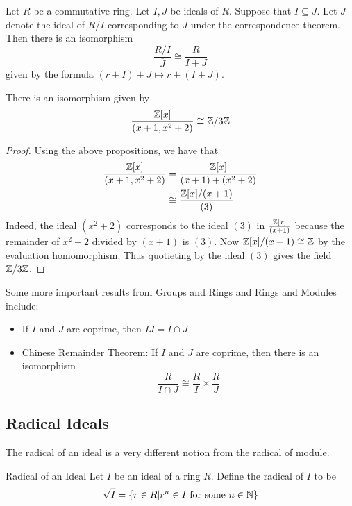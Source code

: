 \documentclass[a4paper]{article}
\begin{document}
\begin{prp}{}{} Let $R$ be a commutative ring. Let $I,J$ be ideals of $R$. Suppose that $I\subseteq J$. Let $\overline{J}$ denote the ideal of $R/I$ corresponding to $J$ under the correspondence theorem. Then there is an isomorphism $$\frac{R/I}{\overline{J}}\cong\frac{R}{I+J}$$ given by the formula $(r+I)+\overline{J}\mapsto r+(I+J)$. 
\end{prp}

\begin{eg}{}{} There is an isomorphism given by $$\frac{\mathbb{Z}[x]}{(x+1,x^2+2)}\cong\mathbb{Z}/3\mathbb{Z}$$ \tcbline
\begin{proof}
Using the above propositions, we have that 
\begin{align*}
\frac{\mathbb{Z}[x]}{(x+1,x^2+2)}&=\frac{\mathbb{Z}[x]}{(x+1)+(x^2+2)}\\
&\cong\frac{\mathbb{Z}[x]/(x+1)}{(3)}
\end{align*}
Indeed, the ideal $(x^2+2)$ corresponds to the ideal $(3)$ in $\frac{\mathbb{Z}[x]}{(x+1)}$ because the remainder of $x^2+2$ divided by $(x+1)$ is $(3)$. Now $\mathbb{Z}[x]/(x+1)\cong\mathbb{Z}$ by the evaluation homomorphism. Thus quotieting by the ideal $(3)$ gives the field $\mathbb{Z}/3\mathbb{Z}$. 
\end{proof}
\end{eg}

Some more important results from Groups and Rings and Rings and Modules include: 
\begin{itemize}
\item If $I$ and $J$ are coprime, then $IJ=I\cap J$
\item Chinese Remainder Theorem: If $I$ and $J$ are coprime, then there is an isomorphism $$\frac{R}{I\cap J}\cong\frac{R}{I}\times\frac{R}{J}$$
\end{itemize}

\subsection{Radical Ideals}
The radical of an ideal is a very different notion from the radical of module. 

\begin{defn}{Radical of an Ideal}{} Let $I$ be an ideal of a ring $R$. Define the radical of $I$ to be $$\sqrt{I}=\{r\in R|r^n\in I\text{ for some }n\in\mathbb{N}\}$$
\end{defn}
\end{document}
